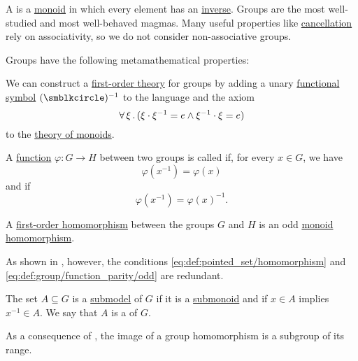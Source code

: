 \begin{definition}\label{def:group}
  A  is a \hyperref[def:monoid]{monoid} in which every element has an \hyperref[def:monoid_inverse]{inverse}. Groups are the most well-studied and most well-behaved magmas. Many useful properties like \hyperref[thm:def:group/cancellative]{cancellation} rely on associativity, so we do not consider non-associative groups.

  Groups have the following metamathematical properties:
  \begin{thmenum}
     We can construct a \hyperref[def:first_order_theory]{first-order theory} for groups by adding a unary \hyperref[def:first_order_language/func]{functional symbol} \( (\anon)^{-1} \) to the language and the axiom
    \begin{equation}\label{eq:def:group/theory/inverse_axiom}
      \forall \thinspace \xi \thinspace . \thinspace (\xi \cdot \xi^{-1} = e \wedge \xi^{-1} \cdot \xi = e)
    \end{equation}
    to the \hyperref[def:monoid/theory]{theory of monoids}.

     A \hyperref[def:function]{function} \( \varphi: G \to H \) between two groups is called  if, for every \( x \in G \), we have
    \begin{equation}\label{eq:def:group/function_parity/even}
      \varphi(x^{-1}) = \varphi(x)
    \end{equation}
    and  if
    \begin{equation}\label{eq:def:group/function_parity/odd}
      \varphi(x^{-1}) = \varphi(x)^{-1}.
    \end{equation}

     A \hyperref[def:first_order_homomorphism]{first-order homomorphism} between the groups \( G \) and \( H \) is an odd \hyperref[def:monoid/homomorphism]{monoid homomorphism}.

    As shown in , however, the conditions \eqref{eq:def:pointed_set/homomorphism} and \eqref{eq:def:group/function_parity/odd} are redundant.

     The set \( A \subseteq G \) is a \hyperref[thm:substructure_is_model]{submodel} of \( G \) if it is a \hyperref[def:monoid/submodel]{submonoid} and if \( x \in A \) implies \( x^{-1} \in A \). We say that \( A \) is a  of \( G \).

    As a consequence of , the image of a group homomorphism is a subgroup of its range.


\end{thmenum}
\end{definition}
